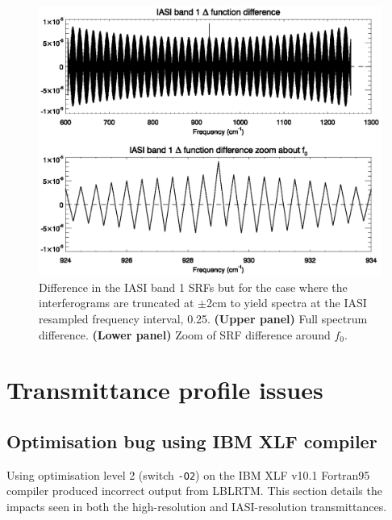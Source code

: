\begin{figure}[htp]
  \centering
  \includegraphics[scale=0.8]{graphics/band1_deltafn_srf_difference_iasidf.eps}
  \caption{Difference in the IASI band 1 SRFs but for the case where the interferograms are truncated at $\pm$2cm to yield spectra at the IASI resampled frequency interval, 0.25\invcm. \textbf{(Upper panel)} Full spectrum difference. \textbf{(Lower panel)} Zoom of SRF difference around $f_{0}$.}
  \label{fig:band1_deltafn_srf_difference_iasidf}
\end{figure}



\section{Transmittance profile issues}

\subsection{Optimisation bug using IBM XLF compiler}
\label{sec:xlf_opt_bug}
Using optimisation level 2 (switch \texttt{-O2}) on the IBM XLF v10.1 Fortran95 compiler produced incorrect output from LBLRTM. This section details the impacts seen in both the high-resolution and IASI-resolution transmittances.


